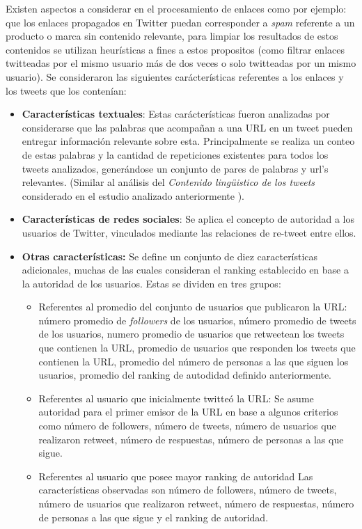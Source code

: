   Existen aspectos a considerar en el procesamiento de enlaces como por ejemplo: que los enlaces propagados en Twitter puedan corresponder a \emph{spam} referente a un producto o marca sin contenido relevante, para limpiar los resultados de estos contenidos se utilizan heurísticas a fines a estos propositos (como filtrar enlaces twitteadas por el mismo usuario más de dos veces o solo twitteadas por un mismo usuario).
  Se consideraron las siguientes carácterísticas referentes a los enlaces y los tweets que los contenían:
  
\begin{itemize}
	\item \textbf{Características textuales}: Estas carácterísticas fueron analizadas por considerarse que las palabras que acompañan a una URL en un tweet pueden entregar información relevante sobre esta. Principalmente se realiza un conteo de estas palabras y la cantidad de repeticiones existentes para todos los tweets analizados, generándose un conjunto de pares de palabras y url's relevantes. (Similar al análisis del \emph{Contenido lingüistico de los tweets} considerado en el estudio analizado anteriormente \cite{PennacchiottiP11}).
	\item \textbf{Características de redes sociales}: Se aplica el concepto de autoridad a los usuarios de Twitter, vinculados mediante las relaciones de re-tweet entre ellos.
	\item \textbf{Otras características:} Se define un conjunto de diez características adicionales, muchas de las cuales consideran el ranking establecido en base a la autoridad de los usuarios. Estas se dividen en tres grupos:
		\begin{itemize}
		\item{Referentes al promedio del conjunto de usuarios que publicaron la URL}: número promedio de \emph{followers} de los usuarios, número promedio de tweets de los usuarios, numero promedio de usuarios que retweetean los tweets que contienen la URL, promedio de usuarios que responden los tweets que contienen la URL, promedio del número de personas a las que siguen los usuarios, promedio del ranking de autodidad definido anteriormente.
		\item{Referentes al usuario que inicialmente twitteó la URL}: Se asume autoridad para el primer emisor de la URL en base a algunos criterios como número de followers, número de tweets, número de usuarios que realizaron retweet, número de respuestas, número de personas a las que sigue.
		\item{Referentes al usuario que posee mayor ranking de autoridad} Las características observadas son número de followers, número de tweets, número de usuarios que realizaron retweet, número de respuestas, número de personas a las que sigue y el ranking de autoridad.
		\end{itemize}
\end{itemize}
	

